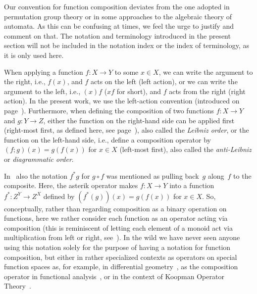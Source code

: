 
Our convention for function composition deviates from the one adopted in permutation group theory
or in some approaches to the algebraic theory of automata. As this can be confusing at times, we feel the urge to justify and comment on that.
The notation and terminology introduced in the present section 
will not be included in the notation index or the index of terminology,
as it is only used here.

When applying a function $f \colon X \to Y$ to some $x \in X$,
we can write the argument to the right, i.e., $f(x)$, and $f$ acts on the left (left action),
or we can write the argument to the left, i.e., $(x)f$ ($xf$ for short), and $f$ acts from the right (right action).
In the present work, we use the left-action convention (introduced on page~\pageref{def:function-application}).
Furthermore, when defining the composition of two functions
$f \colon X \to Y$ and $g \colon Y \to Z$, either the function on the right-hand side
can be applied first (right-most first, as defined here, see page~\pageref{def:fun_comp}), also
called the \emph{Leibniz order}, or the function on the left-hand side, i.e.,
define a composition operator by $(f ; g)(x) = g(f(x))$ for $x \in X$ (left-most first), also called the \emph{anti-Leibniz} or \emph{diagrammatic order}.

In~\cite{nlab:composition} also the notation $f^{\ast}g$ for $g \circ f$
was mentioned as pulling back~$g$ along~$f$ to the composite. Here,
the asterik operator makes $f \colon X \to Y$
into a function $f^{\ast} \colon Z^Y \to Z^X$
defined by $(f^{\ast}(g))(x) = g(f(x))$ for $x \in X$.
So, conceptually, rather than regarding composition as a binary operation
on functions, here we rather consider each function as an operator
acting via composition (this is reminiscent of letting each element of a monoid
act via multiplication from left or right, see~\cite[Prop.~4.25]{Pin2022}).
In the wild we have never seen anyone using this notation solely
for the purpose of having a notation for function composition,
but either in rather specialized contexts as operators on special
function spaces as, for example, in differential geometry~\cite[p.~77 \& p.~89]{spivak1971calculus},
as the composition operator in functional analysis~\cite{DAnielloMaiuriello2020_surveyCompositionOperators},
or in the context of Koopman Operator Theory~\cite{DograRedman2020_OptimizingNNsKoopman}.

